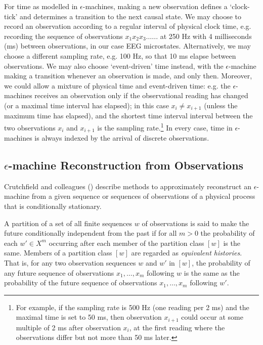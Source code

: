 \documentclass[journal]{IEEEtran}
\begin{document}
For time as modelled in $\epsilon$-machines, making a new observation defines a `clock-tick' and determines a transition to the next causal state. 
We may choose to record an observation  according to a regular interval of
physical clock time, e.g. recording the sequence of observations $x_1 x_2 x_3 \ldots ... $  at 250 Hz  with 4 milliseconds (ms) between observations, in our case EEG microstates.   
Alternatively, we may choose a different sampling rate, e.g. 100 Hz, so that 10 ms elapse between observations.
We may also choose `event-driven' time instead, with the $\epsilon$-machine making a transition whenever  an observation is made, and only then.
 Moreover, we could allow a mixture of physical time and event-driven time: e.g. the $\epsilon$-machines receives an observation only if the observational reading has changed (or a maximal time interval
 has elapsed);  in this case $x_i \neq x_{i+1}$ (unless the maximum time has elapsed),
 and the shortest time interval interval between
 the two observations $x_i$ and $x_{i+1}$ is the sampling rate.\footnote{   For example, if the sampling rate is 500 Hz (one
 reading per 2 ms) and the maximal time is set to 50 ms, then observation $x_{i+1}$ could occur at some multiple
 of 2 ms after observation $x_i$, at the first reading where the observations differ but not more than 50 ms later.}
In every case, time  in $\epsilon$-machines is always indexed by the arrival of discrete observations. 
 
 \subsection{$\epsilon$-machine Reconstruction from Observations}\label{Epsilon}
 
 Crutchfield and colleagues (\cite{Crutchfield1993,CrutchfieldYoung1989,Shalizi2003,Shalizi2004}) describe methods to approximately reconstruct an $\epsilon$-machine
 from a given sequence or sequences of observations of a physical process that is conditionally stationary.
 
A partition of a set of all finite sequences $w$ of observations  is said to make the future conditionally independent from the past if
 for all $m>0$ the probability of each $w' \in X^{m}$ occurring after each member of the partition class $[w]$ is the same. Members of a partition class $[w]$
 are regarded as {\em equivalent histories}. That is, for any two observation sequences $w$ and $w'$ in $[w]$,
 the probability of any future sequence of observations $x_1, \ldots, x_m$ following $w$ is the same as the probability of the future sequence of
observations $x_1, \ldots, x_m$ following $w'$. 
\end{document}
